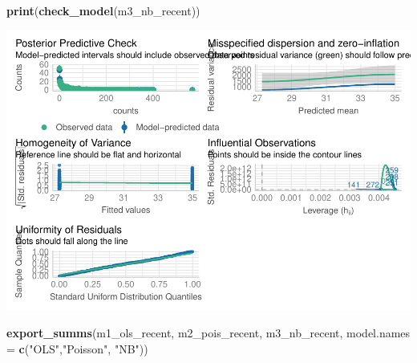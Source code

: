 \documentclass[
]{article}
\newenvironment{Shaded}{\begin{snugshade}}{\end{snugshade}}
\newcommand{\AttributeTok}[1]{\textcolor[rgb]{0.13,0.29,0.53}{#1}}
\newcommand{\FunctionTok}[1]{\textcolor[rgb]{0.13,0.29,0.53}{\textbf{#1}}}
\newcommand{\NormalTok}[1]{#1}
\newcommand{\StringTok}[1]{\textcolor[rgb]{0.31,0.60,0.02}{#1}}
\begin{document}
\begin{Shaded}
\begin{Highlighting}[]
\FunctionTok{print}\NormalTok{(}\FunctionTok{check\_model}\NormalTok{(m3\_nb\_recent))}
\end{Highlighting}
\end{Shaded}

\includegraphics{hw1-lobstrs-eds241_files/figure-latex/unnamed-chunk-43-1.pdf}

\begin{Shaded}
\begin{Highlighting}[]
\FunctionTok{export\_summs}\NormalTok{(m1\_ols\_recent, m2\_pois\_recent, m3\_nb\_recent,}
             \AttributeTok{model.names =} \FunctionTok{c}\NormalTok{(}\StringTok{"OLS"}\NormalTok{,}\StringTok{"Poisson"}\NormalTok{, }\StringTok{"NB"}\NormalTok{))}
\end{Highlighting}
\end{Shaded}

 
  \providecommand{\huxb}[2]{\arrayrulecolor[RGB]{#1}\global\arrayrulewidth=#2pt}
  \providecommand{\huxvb}[2]{\color[RGB]{#1}\vrule width #2pt}
  \providecommand{\huxtpad}[1]{\rule{0pt}{#1}}
  \providecommand{\huxbpad}[1]{\rule[-#1]{0pt}{#1}}
\end{document}
